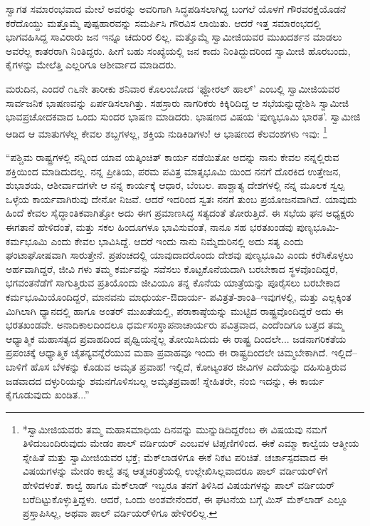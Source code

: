 ಸ್ವಾಗತ ಸಮಾರಂಭವಾದ ಮೇಲೆ ಅವರನ್ನು ಅವರಿಗಾಗಿ ಸಿದ್ಧಪಡಿಸಲಾಗಿದ್ದ ಬಂಗಲೆ ಯೊಳಗೆ ಗೌರವರಕ್ಷೆಯೊಡನೆ ಕರೆದೊಯ್ದು ಮತ್ತೊಮ್ಮೆ ಪುಷ್ಪಹಾರವನ್ನು ಸಮರ್ಪಿಸಿ ಗೌರವಿಸ ಲಾಯಿತು. ಆದರೆ ಇತ್ತ ಸಮಾರಂಭದಲ್ಲಿ ಭಾಗವಹಿಸಿದ್ದ ಸಾವಿರಾರು ಜನ ಇನ್ನೂ ಚದುರಿರ ಲಿಲ್ಲ. ಮತ್ತೊಮ್ಮೆ ಸ್ವಾಮೀಜಿಯವರ ಮುಖದರ್ಶನ ಮಾಡಲು ಅವರೆಲ್ಲ ಕಾತರರಾಗಿ ನಿಂತಿದ್ದರು. ಹೀಗೆ ಬಹು ಸಂಖ್ಯೆಯಲ್ಲಿ ಜನ ಕಾದು ನಿಂತಿದ್ದುದರಿಂದ ಸ್ವಾಮೀಜಿ ಹೊರಬಂದು, ಕೈಗಳನ್ನು ಮೇಲೆತ್ತಿ ಎಲ್ಲರಿಗೂ ಆಶೀರ್ವಾದ ಮಾಡಿದರು.

ಮರುದಿನ, ಎಂದರೆ ೧೬ನೇ ತಾರೀಕು ಶನಿವಾರ ಕೊಲಂಬೋದ ‘ಫ್ಲೋರಲ್ ಹಾಲ್​’ ಎಂಬಲ್ಲಿ ಸ್ವಾಮೀಜಿಯವರ ಸಾರ್ವಜನಿಕ ಭಾಷಣವನ್ನು ಏರ್ಪಡಿಸಲಾಗಿತ್ತು. ಸಹಸ್ರಾರು ನಾಗರಿಕರು ಕಿಕ್ಕಿರಿದಿದ್ದ ಆ ಸಭೆಯನ್ನುದ್ದೇಶಿಸಿ ಸ್ವಾಮೀಜಿ ಭಾವಪ್ರಚೋದಕವಾದ ಒಂದು ಸುಂದರ ಭಾಷಣ ಮಾಡಿದರು. ಭಾಷಣದ ವಿಷಯ ‘ಪುಣ್ಯಭೂಮಿ ಭಾರತ’. ಸ್ವಾಮೀಜಿ ಆಡಿದ ಆ ಮಾತುಗಳೆಲ್ಲ ಕೇವಲ ಶಬ್ದಗಳಲ್ಲ, ಶಕ್ತಿಯ ನುಡಿಕಿಡಿಗಳು! ಆ ಭಾಷಣದ ಕೆಲವಂಶಗಳು ಇವು: \footnote{*ಸ್ವಾಮೀಜಿಯವರು ತಮ್ಮ ಮಹಾಸಮಾಧಿಯ ದಿನವನ್ನು ಮುನ್ನುಡಿದಿದ್ದರೆಂಬ ಈ ವಿಷಯವು ನಮಗೆ ತಿಳಿದುಬಂದಿರುವುದು ಮೇಡಂ ಪಾಲ್ ವರ್ಡಿಯರ್ ಎಂಬವಳ ಟಿಪ್ಪಣಿಗಳಿಂದ. ಈಕೆ ಎಮ್ಮಾ ಕಾಲ್ವೆಯ ಆತ್ಮೀಯ ಸ್ನೇಹಿತೆ ಮತ್ತು ಸ್ವಾಮೀಜಿಯವರ ಭಕ್ತೆ; ಮೆಕ್​ಲಾಡಳಿಗೂ ಈಕೆ ನಿಕಟ ಪರಿಚಿತೆ. ಚರ್ಚಾಸ್ಪದವಾದ ಈ ವಿಷಯಗಳನ್ನು ಮೇಡಂ ಕಾಲ್ವೆ ತನ್ನ ಆತ್ಮಚರಿತ್ರೆಯಲ್ಲಿ ಉಲ್ಲೇಖಿಸಿಲ್ಲವಾದರೂ ಪಾಲ್ ವರ್ಡಿಯರ್​ಳಿಗೆ ಹೇಳಿದಳಂತೆ. ಕಾಲ್ವೆ ಹಾಗೂ ಮೆಕ್​ಲಾಡ್ ಇಬ್ಬರೂ ತನಗೆ ತಿಳಿಸಿದ ವಿಷಯಗಳನ್ನು ಪಾಲ್ ವರ್ಡಿಯರ್ ಬರೆದಿಟ್ಟುಕೊಳ್ಳುತ್ತಿದ್ದಳು. ಆದರೆ, ಒಂದು ಅಂಶವೇನೆಂದರೆ, ಈ ಘಟನೆಯ ಬಗ್ಗೆ ಮಿಸ್ ಮೆಕ್​ಲಾಡ್ ಎಲ್ಲೂ ಪ್ರಸ್ತಾಪಿಸಿಲ್ಲ, ಅಥವಾ ಪಾಲ್ ವರ್ಡಿಯರ್​ಳಿಗೂ ಹೇಳಿರಲಿಲ್ಲ.}

“ಪಶ್ಚಿಮ ರಾಷ್ಟ್ರಗಳಲ್ಲಿ ನನ್ನಿಂದ ಯಾವ ಯತ್ಕಿಂಚಿತ್ ಕಾರ್ಯ ನಡೆಯಿತೋ ಅದನ್ನು ನಾನು ಕೇವಲ ನನ್ನಲ್ಲಿರುವ ಶಕ್ತಿಯಿಂದ ಮಾಡಿದುದಲ್ಲ. ನನ್ನ ಪ್ರೀತಿಯ, ಪರಮ ಪವಿತ್ರ ಮಾತೃಭೂಮಿ ಯಿಂದ ನನಗೆ ದೊರಕಿದ ಉತ್ತೇಜನ, ಶುಭಾಶಯ, ಆಶೀರ್ವಾದಗಳೇ ಆ ನನ್ನ ಕಾರ್ಯಕ್ಕೆ ಆಧಾರ, ಬೆಂಬಲ. ಪಾಶ್ಚಾತ್ಯ ದೇಶಗಳಲ್ಲಿ ನನ್ನ ಮೂಲಕ ಸ್ವಲ್ಪ ಒಳ್ಳೆಯ ಕಾರ್ಯವಾಗಿರುವು ದೇನೋ ನಿಜವೆ. ಆದರೆ ಇದರಿಂದ ಸ್ವತಃ ನನಗೆ ತುಂಬ ಪ್ರಯೋಜನವಾಗಿದೆ. ಯಾವುದು ಹಿಂದೆ ಕೇವಲ ಸೈದ್ಧಾಂತಿಕವಾಗಿತ್ತೋ ಅದು ಈಗ ಪ್ರಮಾಣಸಿದ್ಧ ಸತ್ಯದಂತೆ ತೋರುತ್ತಿದೆ. ಈ ಸಭೆಯ ಘನ ಅಧ್ಯಕ್ಷರು ಈಗತಾನೆ ಹೇಳಿದಂತೆ, ಮತ್ತು ಸಕಲ ಹಿಂದೂಗಳೂ ಭಾವಿಸುವಂತೆ, ನಾನೂ ಸಹ ಭರತಖಂಡವು ಪುಣ್ಯಭೂಮಿ-ಕರ್ಮಭೂಮಿ ಎಂದು ಕೇವಲ ಭಾವಿಸಿದ್ದೆ. ಆದರೆ ಇಂದು ನಾನು ನಿಮ್ಮೆದುರಿನಲ್ಲಿ ಅದು ಸತ್ಯ ಎಂದು ಘಂಟಾಘೋಷವಾಗಿ ಸಾರುತ್ತೇನೆ. ಪ್ರಪಂಚದಲ್ಲಿ ಯಾವುದಾದರೊಂದು ದೇಶವು ಪುಣ್ಯಭೂಮಿ ಎಂದು ಕರೆಸಿಕೊಳ್ಳಲು ಅರ್ಹವಾಗಿದ್ದರೆ, ಜೀವಿ ಗಳು ತಮ್ಮ ಕರ್ಮವನ್ನು ಸವೆಸಲು ಕೊಟ್ಟಕೊನೆಯದಾಗಿ ಬರಬೇಕಾದ ಸ್ಥಳವೊಂದಿದ್ದರೆ, ಭಗವಂತನೆಡೆಗೆ ಸಾಗುತ್ತಿರುವ ಪ್ರತಿಯೊಂದು ಜೀವಿಯೂ ತನ್ನ ಕೊನೆಯ ಯಾತ್ರೆಯನ್ನು ಪೂರೈಸಲು ಬರಬೇಕಾದ ಕರ್ಮಭೂಮಿಯೊಂದಿದ್ದರೆ, ಮಾನವನು ಮಾಧುರ್ಯ-ಔದಾರ್ಯ- ಪವಿತ್ರತೆ-ಶಾಂತಿ–ಇವುಗಳಲ್ಲಿ, ಮತ್ತು ಎಲ್ಲಕ್ಕಿಂತ ಮಿಗಿಲಾಗಿ ಧ್ಯಾನದಲ್ಲಿ ಹಾಗೂ ಅಂತರ್ ಮುಖತೆಯಲ್ಲಿ, ಪರಾಕಾಷ್ಠೆಯನ್ನು ಮುಟ್ಟಿದ ರಾಷ್ಟ್ರವೊಂದಿದ್ದರೆ ಅದು ಈ ಭರತಖಂಡವೇ. ಅನಾದಿಕಾಲದಿಂದಲೂ ಧರ್ಮಸಂಸ್ಥಾಪನಾಚಾರ್ಯರು ಪವಿತ್ರವಾದ, ಎಂದೆಂದಿಗೂ ಬತ್ತದ ತಮ್ಮ ಆಧ್ಯಾತ್ಮಿಕ ಮಹಾಸತ್ಯದ ಪ್ರವಾಹದಿಂದ ಪೃಥ್ವಿಯನ್ನೆಲ್ಲ ತೋಯಿಸಿದುದು ಈ ರಾಷ್ಟ್ರ ದಿಂದಲೇ... ಜಡನಾಗರಿಕತೆಯ ಪ್ರಪಂಚಕ್ಕೆ ಆಧ್ಯಾತ್ಮಿಕ ಚೈತನ್ಯವನ್ನೆರೆಯುವ ಮಹಾ ಪ್ರವಾಹವೂ ಇಂದು ಈ ರಾಷ್ಟ್ರದಿಂದಲೇ ಚಿಮ್ಮಬೇಕಾಗಿದೆ. ಇಲ್ಲಿದೆ–ಬಾಳಿಗೆ ಹೊಸ ಬೆಳಕನ್ನು ಕೊಡುವ ಅಮೃತ ಪ್ರವಾಹ! ಇಲ್ಲಿದೆ, ಕೋಟ್ಯಂತರ ಜೀವಿಗಳ ಎದೆಯನ್ನು ದಹಿಸುತ್ತಿರುವ ಜಡವಾದದ ದಳ್ಳುರಿಯನ್ನು ಶಮನಗೊಳಿಸಬಲ್ಲ ಅಮೃತಪ್ರವಾಹ! ಸ್ನೇಹಿತರೇ, ನಂಬಿ ಇದನ್ನು, ಈ ಕಾರ್ಯ ಕೈಗೂಡುವುದು ಖಂಡಿತ...”

